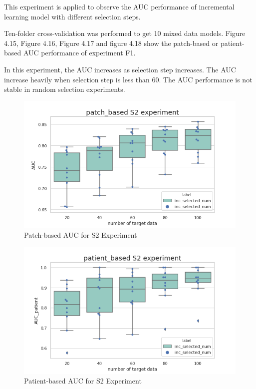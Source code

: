 This experiment is applied to observe the AUC performance of incremental learning model with different selection steps. 

Ten-folder cross-validation was performed to get 10 mixed data models.
Figure 4.15, Figure 4.16, Figure 4.17 and figure 4.18 show the patch-based or patient-based AUC performance of experiment F1. 

In this experiment, the AUC increases as selection step increases. The AUC increase heavily when selection step is less than 60. The AUC performance is not stable in random selection experiments.

\begin{figure}[H]
    \hfil
    \begin{minipage}[t]{0.9\textwidth}
        \includegraphics[width=\textwidth]{fig/S2_num_patch.png}
        \caption{\label{fig:parallel1}Patch-based AUC for S2 Experiment}
    \end{minipage}
    \hfil
\end{figure}
\begin{figure}[H]
    \hfil
    \begin{minipage}[t]{0.9\textwidth}
        \includegraphics[width=\textwidth]{fig/S2_num_patient.png}
        \caption{\label{fig:parallel1}Patient-based AUC for S2 Experiment}
    \end{minipage}
    \hfil
\end{figure}
